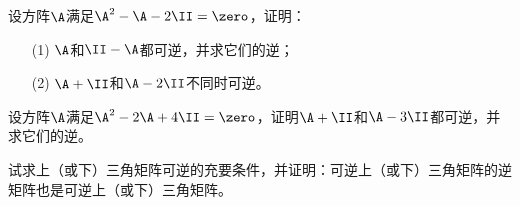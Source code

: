 \begin{frame}
  \begin{footnotesize}
    \begin{exampleblock}{45}
      设方阵$\A$满足$\A^2-\A-2\II=\zero$，证明：
      \begin{itemize}
      \item[(1)]$\A$和$\II-\A$都可逆，并求它们的逆；
      \item[(2)]$\A+\II$和$\A-2\II$不同时可逆。
      \end{itemize}
    \end{exampleblock}
  \end{footnotesize}
\end{frame}



\begin{frame}
  \begin{footnotesize}
    \begin{exampleblock}{46}
      设方阵$\A$满足$\A^2-2\A+4\II=\zero$，证明$\A+\II$和$\A-3\II$都可逆，并求它们的逆。
    \end{exampleblock}
  \end{footnotesize}
\end{frame}



\begin{frame}
  \begin{footnotesize}
    \begin{exampleblock}{47}
      试求上（或下）三角矩阵可逆的充要条件，并证明：可逆上（或下）三角矩阵的逆矩阵也是可逆上（或下）三角矩阵。
    \end{exampleblock}
  \end{footnotesize}
\end{frame}



\begin{frame}
  \begin{footnotesize}
    \begin{exampleblock}{28}
      
    \end{exampleblock}
  \end{footnotesize}
\end{frame}


\begin{frame}
  \begin{footnotesize}
    \begin{exampleblock}{28}
      
    \end{exampleblock}
  \end{footnotesize}
\end{frame}



